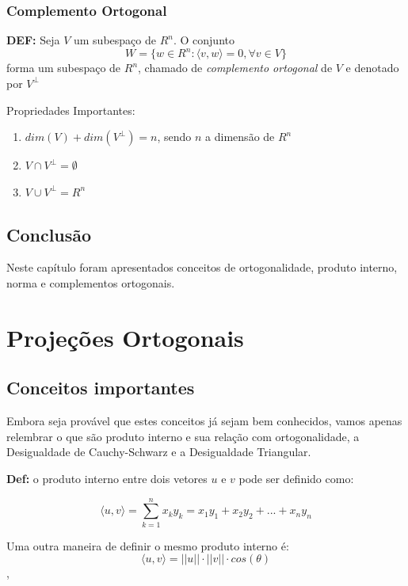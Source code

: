 \documentclass[12pt]{article}
\begin{document}
\subsubsection{Complemento Ortogonal}
\textbf{DEF:} Seja $V$ um subespaço de $R^{n}$. O conjunto 
\begin{equation*}
	W=\{w\in R^n :\langle v,w \rangle=0,\forall v\in V\}
\end{equation*}
forma um subespaço de $R^n$, chamado de \textit{complemento ortogonal} de $V$ e denotado por $V^{\perp}$

Propriedades Importantes:
\begin{enumerate}
	\item $dim(V)+dim(V^{\perp})=n$, sendo $n$ a dimensão de $R^n$
	\item $V \cap V^{\perp}=\emptyset$
	\item $V \cup V^{\perp}=R^n$
\end{enumerate}
\subsection{Conclusão}
Neste capítulo foram apresentados conceitos de ortogonalidade, produto interno, norma e complementos ortogonais. 

\section{Projeções Ortogonais}

\subsection{Conceitos importantes}

Embora seja provável que estes conceitos já sejam bem conhecidos, vamos apenas relembrar o que são produto interno e sua relação com ortogonalidade, a Desigualdade de  Cauchy-Schwarz e a Desigualdade Triangular.

\textbf{Def:} o produto interno entre dois vetores $u$ e $v$ pode ser definido como:

\begin{equation*}
	\langle u,v \rangle=\sum_{k=1}^{n}x_k y_k=x_1 y_1+x_2 y_2+...+x_n y_n
\end{equation*}

Uma outra maneira de definir o mesmo produto interno é:
\begin{equation*}
	\langle u,v \rangle=||u||\cdot||v||\cdot cos(\theta)
\end{equation*},
\end{document}
